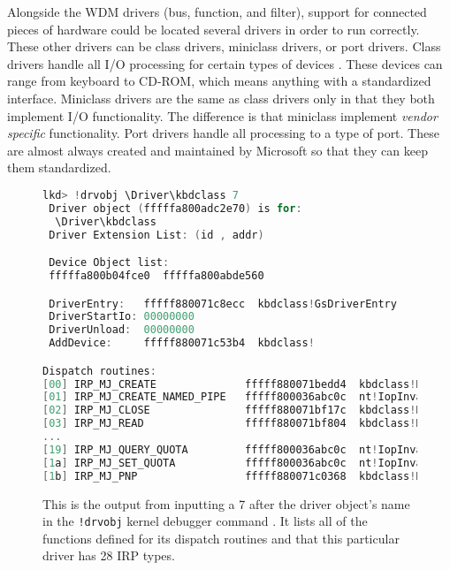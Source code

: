 \documentclass[10pt,draftclsnofoot,onecolumn]{IEEEtran}
\begin{document}
\par Alongside the WDM drivers (bus, function, and filter), support for connected pieces of hardware could be located several drivers in order to run correctly.
These other drivers can be class drivers, miniclass drivers, or port drivers.
Class drivers handle all I/O processing for certain types of devices \cite{win:2}.
These devices can range from keyboard to CD-ROM, which means anything with a standardized interface.
Miniclass drivers are the same as class drivers only in that they both implement I/O functionality.
The difference is that miniclass implement \textit{vendor specific} functionality.
Port drivers handle all processing to a type of port.
These are almost always created and maintained by Microsoft so that they can keep them standardized.

\begin{figure}[h]
\begin{lstlisting}[language=C]
 lkd> !drvobj \Driver\kbdclass 7
 Driver object (fffffa800adc2e70) is for:
  \Driver\kbdclass
 Driver Extension List: (id , addr)

 Device Object list:
 fffffa800b04fce0  fffffa800abde560

 DriverEntry:   fffff880071c8ecc  kbdclass!GsDriverEntry
 DriverStartIo: 00000000
 DriverUnload:  00000000
 AddDevice:     fffff880071c53b4  kbdclass!

Dispatch routines:
[00] IRP_MJ_CREATE              fffff880071bedd4  kbdclass!KeyboardClassCreate
[01] IRP_MJ_CREATE_NAMED_PIPE   fffff800036abc0c  nt!IopInvalidDeviceRequest
[02] IRP_MJ_CLOSE               fffff880071bf17c  kbdclass!KeyboardClassClose
[03] IRP_MJ_READ                fffff880071bf804  kbdclass!KeyboardClassRead
...
[19] IRP_MJ_QUERY_QUOTA         fffff800036abc0c  nt!IopInvalidDeviceRequest
[1a] IRP_MJ_SET_QUOTA           fffff800036abc0c  nt!IopInvalidDeviceRequest
[1b] IRP_MJ_PNP                 fffff880071c0368  kbdclass!KeyboardPnP
\end{lstlisting}
\centering
\captionsetup{justification=centering}
\caption{
  This is the output from inputting a 7 after the driver object's name in the \texttt{!drvobj} kernel debugger command \cite{win:2}.
  It lists all of the functions defined for its dispatch routines and that this particular driver has 28 IRP types.
}
\label{code:dispatch_routine}
\end{figure}
\end{document}
